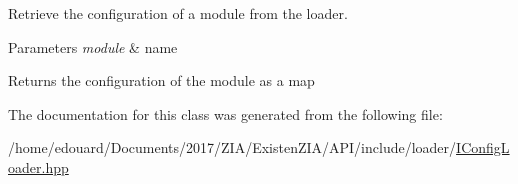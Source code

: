 Retrieve the configuration of a module from the loader. 


\begin{DoxyParams}{Parameters}
{\em module} & name \\
\hline
\end{DoxyParams}
\begin{DoxyReturn}{Returns}
the configuration of the module as a map 
\end{DoxyReturn}


The documentation for this class was generated from the following file\+:\begin{DoxyCompactItemize}
\item 
/home/edouard/\+Documents/2017/\+Z\+I\+A/\+Existen\+Z\+I\+A/\+A\+P\+I/include/loader/\mbox{\hyperlink{IConfigLoader_8hpp}{I\+Config\+Loader.\+hpp}}\end{DoxyCompactItemize}
